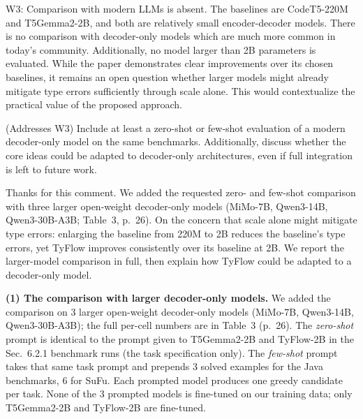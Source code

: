 \documentclass[11pt,a4paper]{article}
\newenvironment{revcomment}[1]{%
  \par\vspace{1.9em}\needspace{5\baselineskip}\noindent{\color{black!30}\hrule height 0.4pt}%
  \smallskip\par\noindent{\bfseries\color{accent}#1}\par\nopagebreak
  \vspace{2pt}%
  \begin{tcolorbox}[enhanced, breakable, frame hidden,
    colback=black!3, borderline west={1.6pt}{0pt}{accent!70},
    left=9pt, right=6pt, top=5pt, bottom=5pt,
    fontupper=\small\itshape, before skip=0pt, after skip=0pt,
    breakable, pad at break*=3pt]\setlength{\parskip}{0.3em}%
}{\end{tcolorbox}}
\newcommand{\response}{\par\medskip\needspace{3\baselineskip}\noindent{\bfseries\color{accent}Response.}%
  \par\nopagebreak\smallskip\ignorespaces}
\begin{document}
\label{com:2.3}
\begin{revcomment}{Comment 2.3.}
W3: Comparison with modern LLMs is absent. The baselines are CodeT5-220M and T5Gemma2-2B, and both are relatively
small encoder-decoder models. There is no comparison with decoder-only
models which are much more common in today's community. Additionally, no
model larger than 2B parameters is evaluated. While the paper demonstrates
clear improvements over its chosen baselines, it remains an open question
whether larger models might already mitigate type errors sufficiently
through scale alone. This would contextualize the practical value of the
proposed approach.\par\smallskip

(Addresses W3) Include at least a zero-shot or few-shot
evaluation of a modern decoder-only model on the same benchmarks.
Additionally, discuss whether the core ideas could be adapted to
decoder-only architectures, even if full integration is left to future work.
\end{revcomment}

\response Thanks for this comment. We added the requested zero- and few-shot comparison with three larger open-weight decoder-only models (MiMo-7B, Qwen3-14B, Qwen3-30B-A3B; Table~3, p.~26). On the concern that scale alone might mitigate type errors: enlarging the baseline from 220M to 2B reduces the baseline's type errors, yet TyFlow improves consistently over its baseline at 2B. We report the larger-model comparison in full, then explain how TyFlow could be adapted to a decoder-only model.

\textbf{(1) The comparison with larger decoder-only models.} We added the comparison on 3 larger open-weight decoder-only models (MiMo-7B, Qwen3-14B, Qwen3-30B-A3B); the full per-cell numbers are in Table~3 (p.~26). 
The \emph{zero-shot} prompt is identical to the prompt given to T5Gemma2-2B and TyFlow-2B in the Sec.~6.2.1 benchmark runs (the task specification only). The \emph{few-shot} prompt takes that same task prompt and prepends 3 solved examples for the Java benchmarks, 6 for SuFu. Each prompted model produces one greedy candidate per task. None of the 3 prompted models is fine-tuned on our training data; only T5Gemma2-2B and TyFlow-2B are fine-tuned.
\end{document}
